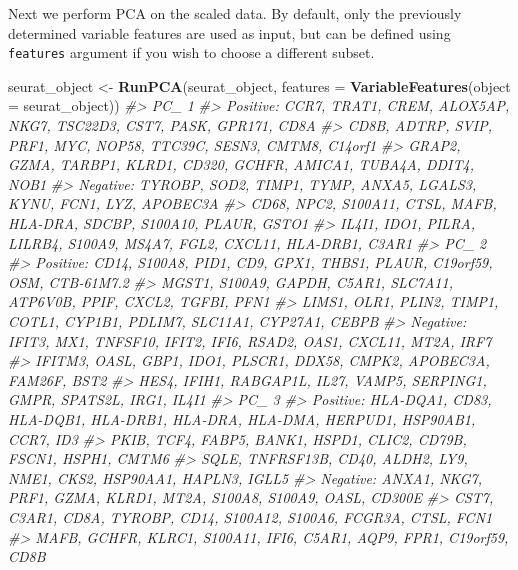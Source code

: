 \documentclass[
]{book}
\newenvironment{Shaded}{\begin{snugshade}}{\end{snugshade}}
\newcommand{\AttributeTok}[1]{\textcolor[rgb]{0.13,0.29,0.53}{#1}}
\newcommand{\CommentTok}[1]{\textcolor[rgb]{0.56,0.35,0.01}{\textit{#1}}}
\newcommand{\FunctionTok}[1]{\textcolor[rgb]{0.13,0.29,0.53}{\textbf{#1}}}
\newcommand{\NormalTok}[1]{#1}
\newcommand{\OtherTok}[1]{\textcolor[rgb]{0.56,0.35,0.01}{#1}}
\begin{document}
Next we perform PCA on the scaled data. By default, only the previously determined variable features are used as input, but can be defined using \texttt{features} argument if you wish to choose a different subset.

\begin{Shaded}
\begin{Highlighting}[]
\NormalTok{seurat\_object }\OtherTok{\textless{}{-}} \FunctionTok{RunPCA}\NormalTok{(seurat\_object, }\AttributeTok{features =} \FunctionTok{VariableFeatures}\NormalTok{(}\AttributeTok{object =}\NormalTok{ seurat\_object))}
\CommentTok{\#\textgreater{} PC\_ 1 }
\CommentTok{\#\textgreater{} Positive:  CCR7, TRAT1, CREM, ALOX5AP, NKG7, TSC22D3, CST7, PASK, GPR171, CD8A }
\CommentTok{\#\textgreater{}     CD8B, ADTRP, SVIP, PRF1, MYC, NOP58, TTC39C, SESN3, CMTM8, C14orf1 }
\CommentTok{\#\textgreater{}     GRAP2, GZMA, TARBP1, KLRD1, CD320, GCHFR, AMICA1, TUBA4A, DDIT4, NOB1 }
\CommentTok{\#\textgreater{} Negative:  TYROBP, SOD2, TIMP1, TYMP, ANXA5, LGALS3, KYNU, FCN1, LYZ, APOBEC3A }
\CommentTok{\#\textgreater{}     CD68, NPC2, S100A11, CTSL, MAFB, HLA{-}DRA, SDCBP, S100A10, PLAUR, GSTO1 }
\CommentTok{\#\textgreater{}     IL4I1, IDO1, PILRA, LILRB4, S100A9, MS4A7, FGL2, CXCL11, HLA{-}DRB1, C3AR1 }
\CommentTok{\#\textgreater{} PC\_ 2 }
\CommentTok{\#\textgreater{} Positive:  CD14, S100A8, PID1, CD9, GPX1, THBS1, PLAUR, C19orf59, OSM, CTB{-}61M7.2 }
\CommentTok{\#\textgreater{}     MGST1, S100A9, GAPDH, C5AR1, SLC7A11, ATP6V0B, PPIF, CXCL2, TGFBI, PFN1 }
\CommentTok{\#\textgreater{}     LIMS1, OLR1, PLIN2, TIMP1, COTL1, CYP1B1, PDLIM7, SLC11A1, CYP27A1, CEBPB }
\CommentTok{\#\textgreater{} Negative:  IFIT3, MX1, TNFSF10, IFIT2, IFI6, RSAD2, OAS1, CXCL11, MT2A, IRF7 }
\CommentTok{\#\textgreater{}     IFITM3, OASL, GBP1, IDO1, PLSCR1, DDX58, CMPK2, APOBEC3A, FAM26F, BST2 }
\CommentTok{\#\textgreater{}     HES4, IFIH1, RABGAP1L, IL27, VAMP5, SERPING1, GMPR, SPATS2L, IRG1, IL4I1 }
\CommentTok{\#\textgreater{} PC\_ 3 }
\CommentTok{\#\textgreater{} Positive:  HLA{-}DQA1, CD83, HLA{-}DQB1, HLA{-}DRB1, HLA{-}DRA, HLA{-}DMA, HERPUD1, HSP90AB1, CCR7, ID3 }
\CommentTok{\#\textgreater{}     PKIB, TCF4, FABP5, BANK1, HSPD1, CLIC2, CD79B, FSCN1, HSPH1, CMTM6 }
\CommentTok{\#\textgreater{}     SQLE, TNFRSF13B, CD40, ALDH2, LY9, NME1, CKS2, HSP90AA1, HAPLN3, IGLL5 }
\CommentTok{\#\textgreater{} Negative:  ANXA1, NKG7, PRF1, GZMA, KLRD1, MT2A, S100A8, S100A9, OASL, CD300E }
\CommentTok{\#\textgreater{}     CST7, C3AR1, CD8A, TYROBP, CD14, S100A12, S100A6, FCGR3A, CTSL, FCN1 }
\CommentTok{\#\textgreater{}     MAFB, GCHFR, KLRC1, S100A11, IFI6, C5AR1, AQP9, FPR1, C19orf59, CD8B }

\end{Highlighting}
\end{Shaded}
\end{document}
